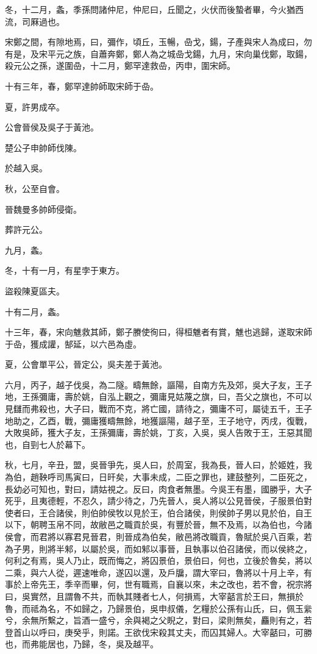 \begin{pinyinscope}
冬，十二月，螽，季孫問諸仲尼，仲尼曰，丘聞之，火伏而後蟄者畢，今火猶西流，司厤過也。

宋鄭之間，有隙地焉，曰，彌作，頃丘，玉暢，喦戈，鍚，子產與宋人為成曰，勿有是，及宋平元之族，自蕭奔鄭，鄭人為之城喦戈鍚，九月，宋向巢伐鄭，取鍚，殺元公之孫，遂圍喦，十二月，鄭罕達救喦，丙申，圍宋師。

十有三年，春，鄭罕達帥師取宋師于喦。

夏，許男成卒。

公會晉侯及吳子于黃池。

楚公子申帥師伐陳。

於越入吳。

秋，公至自會。

晉魏曼多帥師侵衛。

葬許元公。

九月，螽。

冬，十有一月，有星孛于東方。

盜殺陳夏區夫。

十有二月，螽。

十三年，春，宋向魋救其師，鄭子賸使徇曰，得桓魋者有賞，魋也逃歸，遂取宋師于喦，獲成讙，郜延，以六邑為虛。

夏，公會單平公，晉定公，吳夫差于黃池。

六月，丙子，越子伐吳，為二隧。疇無餘，謳陽，自南方先及郊，吳大子友，王子地，王孫彌庸，壽於姚，自泓上觀之，彌庸見姑蔑之旗，曰，吾父之旗也，不可以見讎而弗殺也，大子曰，戰而不克，將亡國，請待之，彌庸不可，屬徒五千，王子地助之，乙酉，戰，彌庸獲疇無餘，地獲謳陽，越子至，王子地守，丙戌，復戰，大敗吳師，獲大子友，王孫彌庸，壽於姚，丁亥，入吳，吳人告敗于王，王惡其聞也，自剄七人於幕下。

秋，七月，辛丑，盟，吳晉爭先，吳人曰，於周室，我為長，晉人曰，於姬姓，我為伯，趙鞅呼司馬寅曰，日旰矣，大事未成，二臣之罪也，建鼓整列，二臣死之，長幼必可知也，對曰，請姑視之。反曰，肉食者無墨。今吳王有墨，國勝乎，大子死乎，且夷德輕，不忍久，請少待之，乃先晉人，吳人將以公見晉侯，子服景伯對使者曰，王合諸侯，則伯帥侯牧以見於王，伯合諸侯，則侯帥子男以見於伯，自王以下，朝聘玉帛不同，故敝邑之職貢於吳，有豐於晉，無不及焉，以為伯也，今諸侯會，而君將以寡君見晉君，則晉成為伯矣，敝邑將改職貢，魯賦於吳八百乘，若為子男，則將半邾，以屬於吳，而如邾以事晉，且執事以伯召諸侯，而以侯終之，何利之有焉，吳人乃止，既而悔之，將囚景伯，景伯曰，何也，立後於魯矣，將以二乘，與六人從，遲速唯命，遂囚以還，及戶牖，謂大宰曰，魯將以十月上辛，有事於上帝先王，季辛而畢，何，世有職焉，自襄以來，未之改也，若不會，祝宗將曰，吳實然，且謂魯不共，而執其賤者七人，何損焉，大宰嚭言於王曰，無損於魯，而祗為名，不如歸之，乃歸景伯，吳申叔儀，乞糧於公孫有山氏，曰，佩玉繠兮，余無所繫之，旨酒一盛兮，余與褐之父睨之，對曰，梁則無矣，麤則有之，若登首山以呼曰，庚癸乎，則諾。王欲伐宋殺其丈夫，而囚其婦人。大宰嚭曰，可勝也，而弗能居也，乃歸，冬，吳及越平。


\end{pinyinscope}
